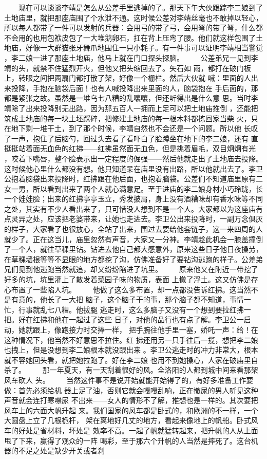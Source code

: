  　　现在可以谈谈李靖是怎么从公差手里逃掉的了。那天下午大伙跟踪李二娘到了 土地庙里，就把那座庙围了个水泄不通。这时候公差对李靖丝毫也不敢掉以轻心， 所以每人都带了一件可以发射的兵器：会用弓的带了弓，会用弩的带了弩，什么都 不会用的也用包袱皮包了一大堆鹅卵石，扛在背上压弯了腰。他们就这样包围了土 地庙，好像一大群猫张牙舞爪地围住一只小耗子。有一件事可以证明李靖相当警觉 ，李二娘一进了那座土地庙，他马上就在门口探头探脑。 　　公差弟兄一见到李靖的头，就禁不住猛烈开火，但他又把头缩回去了。矢石如 雨，都打在破门板上，转眼之间把两扇门都打散了架，好像一个栅栏。然后大伙就 喊：里面的人出来投降，手抱在脑袋后面！也有人喊投降出来里面的人，脑袋抱在 手后面的，那都是紧张之故。虽然是一堆乌七八糟的乱嚷嚷，但还听得出是什么意 思。当时李靖除了出来投降别无出路，因为那五百人一拥而上足可以把土地庙推倒 ，还能把筑成土地庙的每一块土坯踩碎，把修建土地庙的每一根木料都拣回家当柴 火，只在地下剩一堆干土，到了那个时候，李靖自然也不会还是一个问题。所以他 长叹了一声，抱住了后脑勺，回过头去看了看吓白了脸蹲坐在地下的李二娘，还有 直挺挺站着面无血色的红拂——红拂虽然面无血色，但是挑着眉毛，双目炯炯有光 ，咬着下嘴唇，整个脸表示出一定程度的倔强——然后他就走出了土地庙去投降。 这时候他心里什么都没有想。他只知道呆在庙里没有出路，所以他就出去了。李卫 公抱着脑袋出来投降时，红拂跟在他后面，也抱着脑袋。公差们不知道庙里原有二 女一男，所以看到出来了两个人就心满意足。至于进庙的李二娘身材小巧玲珑，长 一个娃娃脸；出来的红拂亭亭玉立，秀发披肩，身上没有酒糟味却有香水味等不同 之处，其实有不少人看出来了，只可惜没人想到不是一个人。大家都以为这座庙有 点灵异之处，应该把老婆带来，让她也走进去。李卫公出来投降时，一副万念俱灰 的样子，大家看了也很放心，全站了出来，围过去要给他套链子，这一来四周的人 就少了。正在这当儿，庙里忽然有声音，大家又一分神。李靖趁此机会一膝盖撞倒 了一个人，就往草稞里钻。钻进去他自己都大感意外，原来这些日子他日夜操劳， 在草稞墙根等等不显眼的地方都挖了沟，仿佛准备好了要钻沟逃跑的样子。公差弟 兄们见到他逃跑当然就追，却又纷纷陷进了坑里。 　　原来他又在附近一带挖了好多的坑，坑里灌上了散发着菜园子味的物质，表面 上撤了浮土。这又仿佛是存心布置了一些陷人坑。 　　他做了这么多布置，却一点都没告诉红拂。这当然不是有意的，他长了一大把 脑子，这个脑子干的事，那个脑子都不知道，事情一忙，行事就乱七八糟。他拔腿 逃走时，这么多脑子又没有一个想到要拉红拂一把。好在红拂和他在一起过了这些 日子，对他的品行也有点了解。李卫公一启动，她就跟上，像跑接力时交捧一样， 把手腕往他手里一塞，娇吒一声：给！在这种情况下，他当然不好意思不拉住。红 拂还用另一只手往后一揽，想把李二娘也拽上，但是没想到李二娘根本就没跟出来 。李卫公逃走时的冲力非常大，根本就不容她回头看，就把她拉跑了。好在李二娘 也用不到她操心，人家在破庙里自杀了。 　　那一年夏天，有一天刮着很好的风。全洛阳的人都到城中间来看那架风车砍人 头。 　　当然这件事不是说开始就能开始得了的，有好多准备工作要做：首先必须给机 器上足了油，否则它就会嘎嘎乱响，正在撤尿的男人听见这种声音就会连打寒噤尿 不出来——女人的情形不了解，推想也是一样的。其次要把风车上的六面大帆升起 来。我们国家的风车都是卧式的，和欧洲的不一样，一个大圆盘上立了几根桅杆， 架在离地好几丈的地方，看起来像地上的帆船。卧式风车的好处是省材料，坏处是 效率不高。一起了帆就猛转起来，把升帆的人从上面甩了下来，赢得了观众的一阵 喝彩，至于那六个升帆的人当然是摔死了。这台机器的不足之处是缺少开关或者刹 
